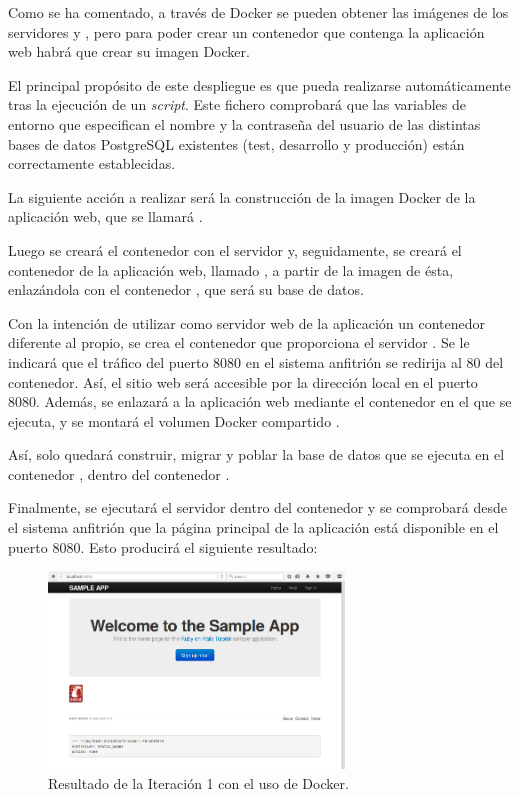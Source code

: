 Como se ha comentado, a través de Docker se pueden obtener las imágenes de los servidores  y , pero para poder crear un contenedor que contenga la aplicación web habrá que crear su imagen Docker. 

El principal propósito de este despliegue es que pueda realizarse automáticamente tras la ejecución de un \textit{script}. Este fichero comprobará que las variables de entorno que especifican el nombre y la contraseña del usuario de las distintas bases de datos PostgreSQL existentes (test, desarrollo y producción) están correctamente establecidas.

La siguiente acción a realizar será la construcción de la imagen Docker de la aplicación web, que se llamará . 

Luego se creará el contenedor  con el servidor  y, seguidamente, se creará el contenedor de la aplicación web, llamado , a partir de la imagen de ésta, enlazándola con el contenedor , que será su base de datos.

Con la intención de utilizar como servidor web de la aplicación un contenedor diferente al propio, se crea el contenedor  que proporciona el servidor . Se le indicará que el tráfico del puerto 8080 en el sistema anfitrión se redirija al 80 del contenedor. Así, el sitio web será accesible por la dirección local en el puerto 8080. Además, se enlazará a la aplicación web mediante el contenedor en el que se ejecuta, y se montará el volumen Docker compartido .

Así, solo quedará construir, migrar y poblar la base de datos que se ejecuta en el contenedor , dentro del contenedor .

Finalmente, se ejecutará el servidor  dentro del contenedor  y se comprobará desde el sistema anfitrión que la página principal de la aplicación  está disponible en el puerto 8080. Esto producirá el siguiente resultado:

\begin{figure}[H]
\centering
\includegraphics[width=0.7\textwidth]{images/figures/resultado1.png}
\caption{Resultado de la Iteración 1 con el uso de Docker.\label{fig:figure_placement_example}}
\end{figure}

